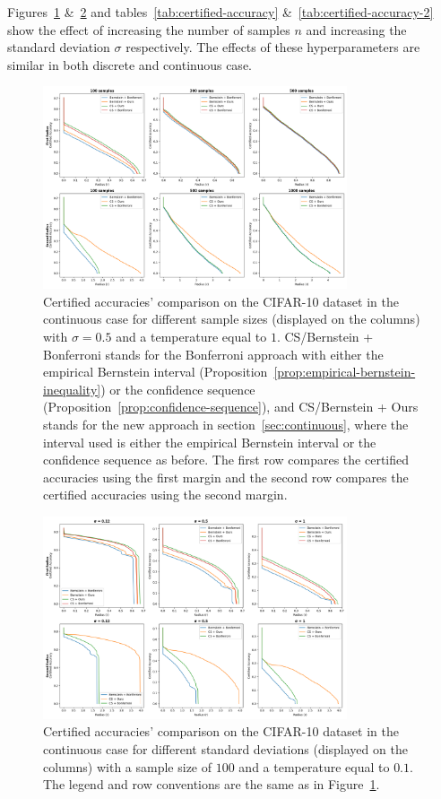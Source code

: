 Figures~\ref{fig:cont_num} \&~\ref{fig:cont_sigma} and tables~\ref{tab:certified-accuracy} \&~\ref{tab:certified-accuracy-2} show the effect of increasing the number of samples $n$ and increasing the standard deviation $\sigma$ respectively.
The effects of these hyperparameters are similar in both discrete and continuous case.
\begin{figure}[htbp]
    \centering
    \includegraphics[width=0.8\textwidth]{images/cont_num}
    \caption{Certified accuracies' comparison on the CIFAR-10 dataset in the continuous case for different sample sizes (displayed on the columns) with $\sigma = 0.5$ and a temperature equal to $1$. CS/Bernstein + Bonferroni stands for the Bonferroni approach with either the empirical Bernstein interval (Proposition~\ref{prop:empirical-bernstein-inequality}) or the confidence sequence (Proposition~\ref{prop:confidence-sequence}), and CS/Bernstein + Ours stands for the new approach in section~\ref{sec:continuous}, where the interval used is either the empirical Bernstein interval or the confidence sequence as before. The first row compares the certified accuracies using the first margin and the second row compares the certified accuracies using the second margin.}
    \label{fig:cont_num}
\end{figure}
\begin{figure}[htbp]
    \centering
    \includegraphics[width=0.8\textwidth]{images/cont_sigma}
    \caption{Certified accuracies' comparison on the CIFAR-10 dataset in the continuous case for different standard deviations (displayed on the columns) with a sample size of $100$ and a temperature equal to $0.1$. The legend and row conventions are the same as in Figure~\ref{fig:cont_num}.}
    \label{fig:cont_sigma}
\end{figure}
